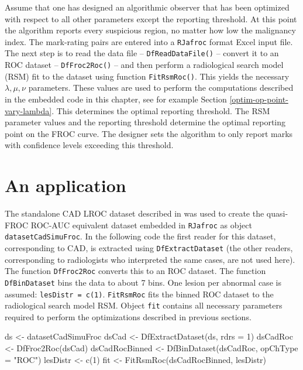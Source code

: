\documentclass[
]{book}
\newenvironment{Shaded}{\begin{snugshade}}{\end{snugshade}}
\newcommand{\AttributeTok}[1]{\textcolor[rgb]{0.77,0.63,0.00}{#1}}
\newcommand{\DecValTok}[1]{\textcolor[rgb]{0.00,0.00,0.81}{#1}}
\newcommand{\FunctionTok}[1]{\textcolor[rgb]{0.00,0.00,0.00}{#1}}
\newcommand{\NormalTok}[1]{#1}
\newcommand{\OtherTok}[1]{\textcolor[rgb]{0.56,0.35,0.01}{#1}}
\newcommand{\StringTok}[1]{\textcolor[rgb]{0.31,0.60,0.02}{#1}}
\begin{document}
Assume that one has designed an algorithmic observer that has been optimized with respect to all other parameters except the reporting threshold. At this point the algorithm reports every suspicious region, no matter how low the malignancy index. The mark-rating pairs are entered into a \texttt{RJafroc} format Excel input file. The next step is to read the data file -- \texttt{DfReadDataFile()} -- convert it to an ROC dataset -- \texttt{DfFroc2Roc()} -- and then perform a radiological search model (RSM) fit to the dataset using function \texttt{FitRsmRoc()}. This yields the necessary \(\lambda, \mu, \nu\) parameters. These values are used to perform the computations described in the embedded code in this chapter, see for example Section \ref{optim-op-point-vary-lambda}. This determines the optimal reporting threshold. The RSM parameter values and the reporting threshold determine the optimal reporting point on the FROC curve. The designer sets the algorithm to only report marks with confidence levels exceeding this threshold.

\hypertarget{optim-op-point-application}{%
\section{An application}\label{optim-op-point-application}}

The standalone CAD LROC dataset described in \citep{hupse2013standalone} was used to create the quasi-FROC ROC-AUC equivalent dataset embedded in \texttt{RJafroc} as object \texttt{datasetCadSimuFroc}. In the following code the first reader for this dataset, corresponding to CAD, is extracted using \texttt{DfExtractDataset} (the other readers, corresponding to radiologists who interpreted the same cases, are not used here). The function \texttt{DfFroc2Roc} converts this to an ROC dataset. The function \texttt{DfBinDataset} bins the data to about 7 bins. One lesion per abnormal case is assumed: \texttt{lesDistr\ =\ c(1)}. \texttt{FitRsmRoc} fits the binned ROC dataset to the radiological search model RSM. Object \texttt{fit} contains all necessary parameters required to perform the optimizations described in previous sections.

\begin{Shaded}
\begin{Highlighting}[]
\NormalTok{ds }\OtherTok{\textless{}{-}}\NormalTok{ datasetCadSimuFroc}
\NormalTok{dsCad }\OtherTok{\textless{}{-}} \FunctionTok{DfExtractDataset}\NormalTok{(ds, }\AttributeTok{rdrs =} \DecValTok{1}\NormalTok{)}
\NormalTok{dsCadRoc }\OtherTok{\textless{}{-}} \FunctionTok{DfFroc2Roc}\NormalTok{(dsCad)}
\NormalTok{dsCadRocBinned }\OtherTok{\textless{}{-}} \FunctionTok{DfBinDataset}\NormalTok{(dsCadRoc, }\AttributeTok{opChType =} \StringTok{"ROC"}\NormalTok{)}
\NormalTok{lesDistr }\OtherTok{\textless{}{-}} \FunctionTok{c}\NormalTok{(}\DecValTok{1}\NormalTok{)}
\NormalTok{fit }\OtherTok{\textless{}{-}} \FunctionTok{FitRsmRoc}\NormalTok{(dsCadRocBinned, lesDistr)}
\end{Highlighting}
\end{Shaded}
\end{document}
